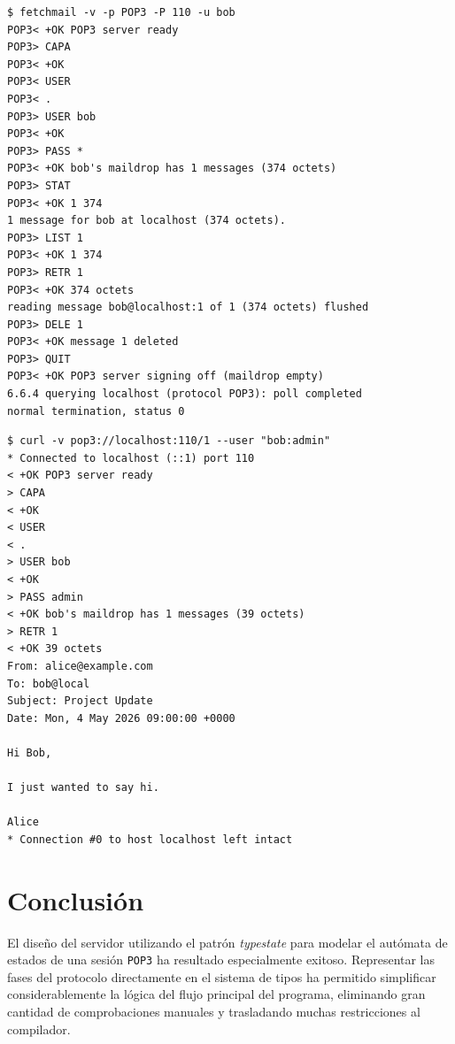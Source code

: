 \documentclass[a4paper]{CSMakotoTechnicalReport}
\begin{document}
\vspace{-12pt}
\begin{minipage}[t]{0.50\textwidth}
\begin{lstlisting}[language={}, numbers=none, basicstyle=\scriptsize]
$ fetchmail -v -p POP3 -P 110 -u bob
POP3< +OK POP3 server ready
POP3> CAPA
POP3< +OK
POP3< USER
POP3< .
POP3> USER bob
POP3< +OK
POP3> PASS *
POP3< +OK bob's maildrop has 1 messages (374 octets)
POP3> STAT
POP3< +OK 1 374
1 message for bob at localhost (374 octets).
POP3> LIST 1
POP3< +OK 1 374
POP3> RETR 1
POP3< +OK 374 octets
reading message bob@localhost:1 of 1 (374 octets) flushed
POP3> DELE 1
POP3< +OK message 1 deleted
POP3> QUIT
POP3< +OK POP3 server signing off (maildrop empty)
6.6.4 querying localhost (protocol POP3): poll completed
normal termination, status 0
\end{lstlisting}
\vspace{-4pt}
\captionsetup{type=lstlisting}
\caption{Integración con un cliente \textit{fetchmail}}
\end{minipage}
\hfill
\begin{minipage}[t]{0.45\textwidth}
\begin{lstlisting}[language={}, numbers=none, basicstyle=\scriptsize]
$ curl -v pop3://localhost:110/1 --user "bob:admin"
* Connected to localhost (::1) port 110
< +OK POP3 server ready
> CAPA
< +OK
< USER
< .
> USER bob
< +OK
> PASS admin
< +OK bob's maildrop has 1 messages (39 octets)
> RETR 1
< +OK 39 octets
From: alice@example.com
To: bob@local
Subject: Project Update
Date: Mon, 4 May 2026 09:00:00 +0000

Hi Bob,

I just wanted to say hi.

Alice
* Connection #0 to host localhost left intact
\end{lstlisting}
\vspace{-4pt}
\captionsetup{type=lstlisting}
\caption{Integración con un cliente \textit{curl}}
\end{minipage}


\section{Conclusión}

El diseño del servidor utilizando el patrón \textit{typestate} para modelar el autómata de estados de una sesión \texttt{POP3} ha resultado especialmente exitoso. Representar las fases del protocolo directamente en el sistema de tipos ha permitido simplificar considerablemente la lógica del flujo principal del programa, eliminando gran cantidad de comprobaciones manuales y trasladando muchas restricciones al compilador.
\end{document}

